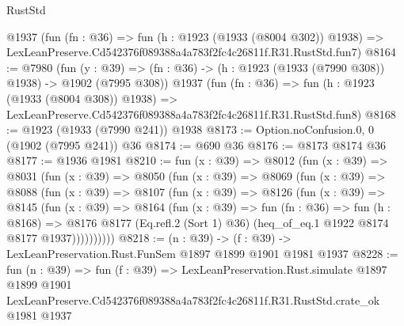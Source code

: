 \begin{lexlean}{RustStd}
\begin{coremodule}
    @1937
    (fun (fn : @36) =>
    fun (h : @1923 (@1933 (@8004 @302)) @1938) =>
    LexLeanPreserve.Cd542376f089388a4a783f2fc4c26811f.R31.RustStd.fun7)
@8164 := @7980
    (fun (y : @39) => (fn : @36) -> (h : @1923 (@1933 (@7990 @308)) @1938) -> @1902 (@7995 @308))
    @1937
    (fun (fn : @36) =>
    fun (h : @1923 (@1933 (@8004 @308)) @1938) =>
    LexLeanPreserve.Cd542376f089388a4a783f2fc4c26811f.R31.RustStd.fun8)
@8168 := @1923 (@1933 (@7990 @241)) @1938
@8173 := Option.noConfusion.{0, 0} (@1902 (@7995 @241)) @36
@8174 := @690 @36
@8176 := @8173 @8174 @36
@8177 := @1936 @1981
@8210 := fun (x : @39) =>
  @8012
    (fun (x : @39) =>
    @8031
      (fun (x : @39) =>
      @8050
        (fun (x : @39) =>
        @8069
          (fun (x : @39) =>
          @8088
            (fun (x : @39) =>
            @8107
              (fun (x : @39) =>
              @8126
                (fun (x : @39) =>
                @8145
                  (fun (x : @39) =>
                  @8164
                    (fun (x : @39) =>
                    fun (fn : @36) =>
                    fun (h : @8168) =>
                    @8176
                      @8177
                      (Eq.refl.{2} (Sort 1) @36)
                      (heq_of_eq.{1} @1922 @8174 @8177 @1937))))))))))
@8218 := (n : @39) -> (f : @39) -> LexLeanPreservation.Rust.FunSem @1897 @1899 @1901 @1981 @1937
@8228 := fun (n : @39) =>
  fun (f : @39) =>
  LexLeanPreservation.Rust.simulate
    @1897
    @1899
    @1901
    LexLeanPreserve.Cd542376f089388a4a783f2fc4c26811f.R31.RustStd.crate_ok
    @1981
    @1937
\end{coremodule}
\end{lexlean}
